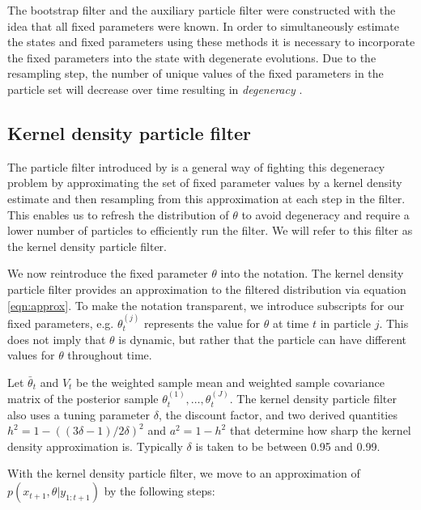 \documentclass{elsarticle}
\begin{document}
The bootstrap filter and the auxiliary particle filter were constructed with the idea that all fixed parameters were known. In order to simultaneously estimate the states and fixed parameters using these methods it is necessary to incorporate the fixed parameters into the state with degenerate evolutions. Due to the resampling step, the number of unique values of the fixed parameters in the particle set will decrease over time resulting in \emph{degeneracy} \citep{Liu:West:comb:2001}.

\subsection{Kernel density particle filter \label{sec:kd}} 

The particle filter introduced by \cite{Liu:West:comb:2001} is a general way of fighting this degeneracy problem by approximating the set of fixed parameter values by a kernel density estimate and then resampling from this approximation at each step in the filter. This enables us to refresh the distribution of $\theta$ to avoid degeneracy and require a lower number of particles to efficiently run the filter. We will refer to this filter as the kernel density particle filter.

We now reintroduce the fixed parameter $\theta$ into the notation. The kernel density particle filter provides an approximation to the filtered distribution via equation \eqref{eqn:approx}. To make the notation transparent, we introduce subscripts for our fixed parameters, e.g. $\theta_t^{(j)}$ represents the value for $\theta$ at time $t$ in particle $j$. This does not imply that $\theta$ is dynamic, but rather that the particle can have different values for $\theta$ throughout time.

Let $\bar{\theta}_t$ and $V_t$ be the weighted sample mean and weighted sample covariance matrix of the posterior sample $\theta_t^{(1)},\ldots,\theta_t^{(J)}$.  The kernel density particle filter also uses a tuning parameter $\delta$, the discount factor, and two derived quantities $h^2 = 1 - ((3\delta - 1)/2\delta)^2$ and $a^2 = 1 - h^2$ that determine how sharp the kernel density approximation is. Typically $\delta$ is taken to be between 0.95 and 0.99.

With the kernel density particle filter, we move to an approximation of $p(x_{t+1},\theta|y_{1:t+1})$ by the following steps:
\end{document}
